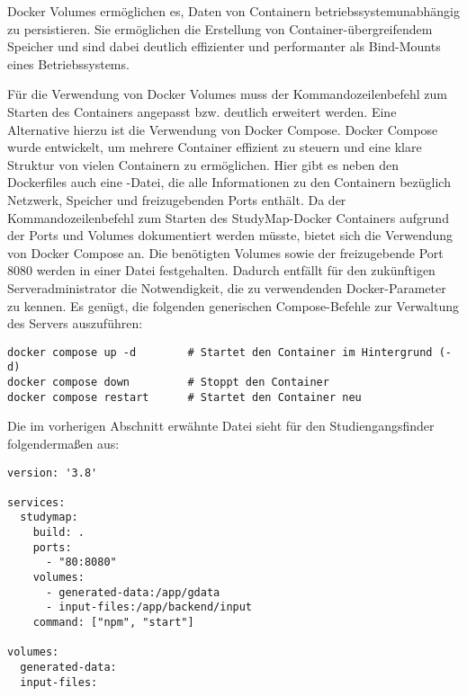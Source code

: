 Docker Volumes ermöglichen es, Daten von Containern betriebssystemunabhängig zu persistieren. Sie ermöglichen die Erstellung von Container-übergreifendem Speicher und sind dabei deutlich effizienter und performanter als Bind-Mounts eines Betriebssystems. \parencite{docker_inc_volumes_0000}

Für die Verwendung von Docker Volumes muss der Kommandozeilenbefehl zum Starten des Containers angepasst bzw. deutlich erweitert werden. Eine Alternative hierzu ist die Verwendung von Docker Compose. Docker Compose wurde entwickelt, um mehrere Container effizient zu steuern und eine klare Struktur von vielen Containern zu ermöglichen. Hier gibt es neben den Dockerfiles auch eine -Datei, die alle Informationen zu den Containern bezüglich Netzwerk, Speicher und freizugebenden Ports enthält. Da der Kommandozeilenbefehl zum Starten des StudyMap-Docker Containers aufgrund der Ports und Volumes dokumentiert werden müsste, bietet sich die Verwendung von Docker Compose an. Die benötigten Volumes sowie der freizugebende Port 8080 werden in einer Datei festgehalten. \parencite{docker_inc_docker_0000} Dadurch entfällt für den zukünftigen Serveradministrator die Notwendigkeit, die zu verwendenden Docker-Parameter zu kennen. Es genügt, die folgenden generischen Compose-Befehle zur Verwaltung des Servers auszuführen:

\noindent
\begin{minipage}{\linewidth}
\begin{lstlisting}[style=Python]
docker compose up -d        # Startet den Container im Hintergrund (-d)
docker compose down         # Stoppt den Container
docker compose restart      # Startet den Container neu
\end{lstlisting}
\end{minipage}

Die im vorherigen Abschnitt erwähnte Datei  sieht für den Studiengangsfinder folgendermaßen aus:
\begin{lstlisting}[style=Python]
version: '3.8'

services:
  studymap:
    build: .
    ports:
      - "80:8080"
    volumes:
      - generated-data:/app/gdata
      - input-files:/app/backend/input
    command: ["npm", "start"]

volumes:
  generated-data:
  input-files:
\end{lstlisting}

